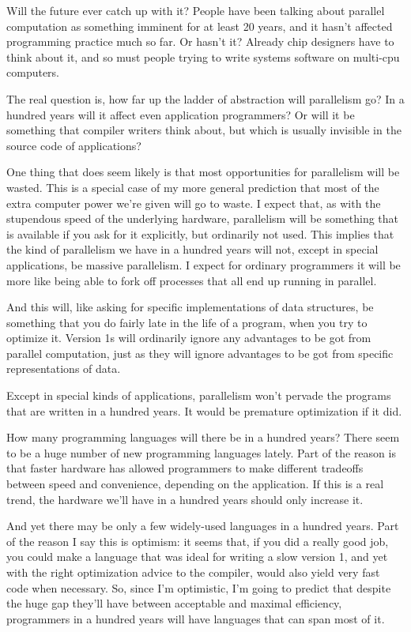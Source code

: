 Will the future ever catch up with it? People have been talking about
parallel computation as something imminent for at least 20 years, and it
hasn't affected programming practice much so far. Or hasn't it? Already
chip designers have to think about it, and so must people trying to
write systems software on multi-cpu computers.

The real question is, how far up the ladder of abstraction will
parallelism go? In a hundred years will it affect even application
programmers? Or will it be something that compiler writers think about,
but which is usually invisible in the source code of applications?

One thing that does seem likely is that most opportunities for
parallelism will be wasted. This is a special case of my more general
prediction that most of the extra computer power we're given will go to
waste. I expect that, as with the stupendous speed of the underlying
hardware, parallelism will be something that is available if you ask for
it explicitly, but ordinarily not used. This implies that the kind of
parallelism we have in a hundred years will not, except in special
applications, be massive parallelism. I expect for ordinary programmers
it will be more like being able to fork off processes that all end up
running in parallel.

And this will, like asking for specific implementations of data
structures, be something that you do fairly late in the life of a
program, when you try to optimize it. Version 1s will ordinarily ignore
any advantages to be got from parallel computation, just as they will
ignore advantages to be got from specific representations of data.

Except in special kinds of applications, parallelism won't pervade the
programs that are written in a hundred years. It would be premature
optimization if it did.

How many programming languages will there be in a hundred years? There
seem to be a huge number of new programming languages lately. Part of
the reason is that faster hardware has allowed programmers to make
different tradeoffs between speed and convenience, depending on the
application. If this is a real trend, the hardware we'll have in a
hundred years should only increase it.

And yet there may be only a few widely-used languages in a hundred
years. Part of the reason I say this is optimism: it seems that, if you
did a really good job, you could make a language that was ideal for
writing a slow version 1, and yet with the right optimization advice to
the compiler, would also yield very fast code when necessary. So, since
I'm optimistic, I'm going to predict that despite the huge gap they'll
have between acceptable and maximal efficiency, programmers in a hundred
years will have languages that can span most of it.

